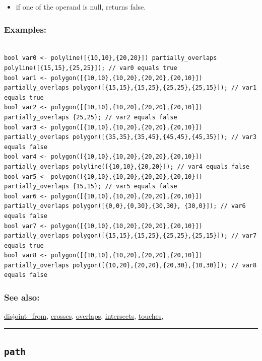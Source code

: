 \documentclass[]{book}
\providecommand{\tightlist}{%
  \setlength{\itemsep}{0pt}\setlength{\parskip}{0pt}}
\theoremstyle{definition}
\theoremstyle{definition}
\theoremstyle{definition}
\theoremstyle{remark}
\begin{document}
\begin{itemize}
\tightlist
\item
  if one of the operand is null, returns false.
\end{itemize}

\subsubsection{Examples:}\label{examples-270}

\begin{verbatim}
 
bool var0 <- polyline([{10,10},{20,20}]) partially_overlaps polyline([{15,15},{25,25}]); // var0 equals true 
bool var1 <- polygon([{10,10},{10,20},{20,20},{20,10}]) partially_overlaps polygon([{15,15},{15,25},{25,25},{25,15}]); // var1 equals true 
bool var2 <- polygon([{10,10},{10,20},{20,20},{20,10}]) partially_overlaps {25,25}; // var2 equals false 
bool var3 <- polygon([{10,10},{10,20},{20,20},{20,10}]) partially_overlaps polygon([{35,35},{35,45},{45,45},{45,35}]); // var3 equals false 
bool var4 <- polygon([{10,10},{10,20},{20,20},{20,10}]) partially_overlaps polyline([{10,10},{20,20}]); // var4 equals false 
bool var5 <- polygon([{10,10},{10,20},{20,20},{20,10}]) partially_overlaps {15,15}; // var5 equals false 
bool var6 <- polygon([{10,10},{10,20},{20,20},{20,10}]) partially_overlaps polygon([{0,0},{0,30},{30,30}, {30,0}]); // var6 equals false 
bool var7 <- polygon([{10,10},{10,20},{20,20},{20,10}]) partially_overlaps polygon([{15,15},{15,25},{25,25},{25,15}]); // var7 equals true 
bool var8 <- polygon([{10,10},{10,20},{20,20},{20,10}]) partially_overlaps polygon([{10,20},{20,20},{20,30},{10,30}]); // var8 equals false
\end{verbatim}

\subsubsection{See also:}\label{see-also-158}

\href{operators-d-to-h.html\#disjoint_from}{disjoint\_from},
\href{operators-b-to-c.html\#crosses}{crosses},
\href{operators-n-to-r.html\#overlaps}{overlaps},
\href{operators-i-to-m.html\#intersects}{intersects},
\href{operators-s-to-z.html\#touches}{touches},

\begin{center}\rule{0.5\linewidth}{\linethickness}\end{center}

\subsection{\texorpdfstring{\texttt{path}}{path}}\label{path}
\end{document}
